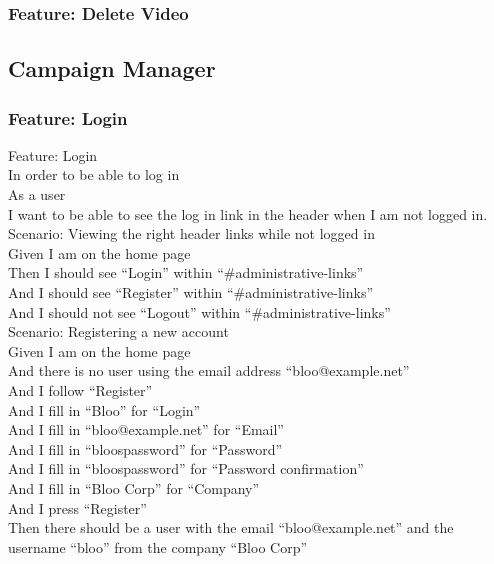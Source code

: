 \documentclass[12pt]{article}
\begin{document}
\subsubsection{Feature: Delete Video}

\subsection{Campaign Manager}

\subsubsection{Feature: Login}

Feature: Login \\
  In order to be able to log in \\
  As a user \\
  I want to be able to see the log in link in the header when I am not logged in. \\

Scenario: Viewing the right header links while not logged in  \\
  Given I am on the home page \\
  Then I should see ``Login'' within ``\#administrative-links'' \\
  And I should see ``Register'' within ``\#administrative-links'' \\
  And I should not see ``Logout'' within ``\#administrative-links'' \\

Scenario: Registering a new account \\
  Given I am on the home page \\
  And there is no user using the email address ``bloo@example.net'' \\
  And I follow ``Register'' \\
  And I fill in ``Bloo'' for ``Login'' \\
  And I fill in ``bloo@example.net'' for ``Email'' \\
  And I fill in ``bloospassword'' for ``Password'' \\
  And I fill in ``bloospassword'' for ``Password confirmation'' \\
  And I fill in ``Bloo Corp'' for ``Company'' \\
  And I press ``Register'' \\
  Then there should be a user with the email ``bloo@example.net'' and the username ``bloo'' from the company ``Bloo Corp'' \\
\end{document}
